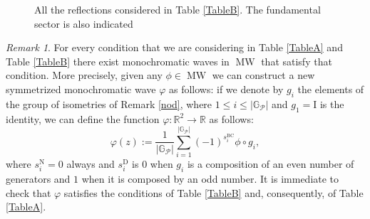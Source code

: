 \documentclass{amsart}
\theoremstyle{definition}
\theoremstyle{remark}
\newtheorem{remark}[theorem]{Remark}
\newcommand{\vp}{\varphi}
\renewcommand\leq\leqslant
\numberwithin{equation}{section}
\theoremstyle{definition}
\theoremstyle{remark}
\DeclareMathOperator\MW{MW}
\newcommand{\I}{{\mathrm I}}
\begin{document}
\begin{figure}
	  \caption{All the reflections considered in Table \ref{TableB}. The fundamental sector is also indicated }
	    \label{domain}
	\end{figure}

    \begin{remark}
        For every condition that we are considering in Table \ref{TableA} and Table \ref{TableB} there exist monochromatic waves in $\MW$ that satisfy that condition. More precisely, given any $\phi\in \MW$ we can construct a new symmetrized monochromatic wave $\varphi$ as follows: if  we denote by $g_i$ the elements of the group of isometries of Remark \ref{nod}, where $1\leq i\leq \left|\mathbb{G}_\mathcal{P}\right|$ and $g_1=\I$ is the identity, we can define the function $\varphi:\mathbb{R}^2\rightarrow\mathbb{R}$ as follows: \begin{equation}
        \varphi(z):=\frac{1}{\left|\mathbb{G}_\mathcal{P}\right|}\sum_{i=1}^{\left|\mathbb{G}_\mathcal{P}\right|}\left(-1\right)^{s_i^{\mathrm{BC}}}\phi\circ g_i,
    \end{equation}where $s_i^{\mathrm{N}}=0$ always and $s_i^{\mathrm{D}}$ is $0$ when $g_i$ is a composition of an even number of generators and $1$ when it is composed by an odd number. It is immediate to check that $\vp$ satisfies the conditions of Table \ref{TableB} and, consequently, of Table \ref{TableA}.
    \end{remark}

    \footnotesize{}
    
\end{document}
